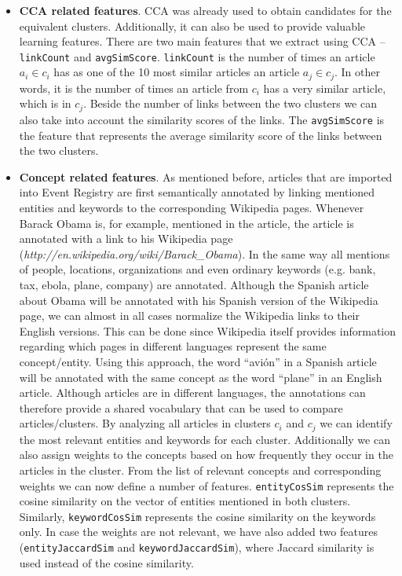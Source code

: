 \documentclass[twoside,11pt]{article}
\begin{document}
\begin{itemize}
\item {\bf CCA related features}. CCA was already used to obtain candidates for the equivalent clusters. Additionally, it can also be used to provide valuable learning features. There are two main features that we extract using CCA -- \texttt{linkCount} and \texttt{avgSimScore}. \texttt{linkCount} is the number of times an article $a_i \in c_i$ has as one of the 10 most similar articles an article $a_j \in c_j$. In other words, it is the number of times an article from $c_i$ has a very similar article, which is in $c_j$. Beside the number of links between the two clusters we can also take into account the similarity scores of the links. The \texttt{avgSimScore} is the feature that represents the average similarity score of the links between the two clusters.

\item {\bf Concept related features}. As mentioned before, articles that are imported into Event Registry are first semantically annotated by linking mentioned entities and keywords to the corresponding Wikipedia pages. Whenever Barack Obama is, for example, mentioned in the article, the article is annotated with a link to his Wikipedia page (\emph{http://en.wikipedia.org/wiki/Barack\_Obama}). In the same way all mentions of people, locations, organizations and even ordinary keywords (e.g. bank, tax, ebola, plane, company) are annotated. Although the Spanish article about Obama will be annotated with his Spanish version of the Wikipedia page, we can almost in all cases normalize the Wikipedia links to their English versions. This can be done since Wikipedia itself provides information regarding which pages in different languages represent the same concept/entity. Using this approach, the word ``avi\'on'' in a Spanish article will be annotated with the same concept as the word ``plane'' in an English article. Although articles are in different languages, the annotations can therefore provide a shared vocabulary that can be used to compare articles/clusters. By analyzing all articles in clusters $c_i$ and $c_j$ we can identify the most relevant entities and keywords for each cluster. Additionally we can also assign weights to the concepts based on how frequently they occur in the articles in the cluster. From the list of relevant concepts and corresponding weights we can now define a number of features. \texttt{entityCosSim} represents the cosine similarity on the vector of entities mentioned in both clusters. Similarly, \texttt{keywordCosSim} represents the cosine similarity on the keywords only. In case the weights are not relevant, we have also added two features (\texttt{entityJaccardSim} and \texttt{keywordJaccardSim}), where Jaccard similarity is used instead of the cosine similarity.


\end{itemize}
\end{document}
